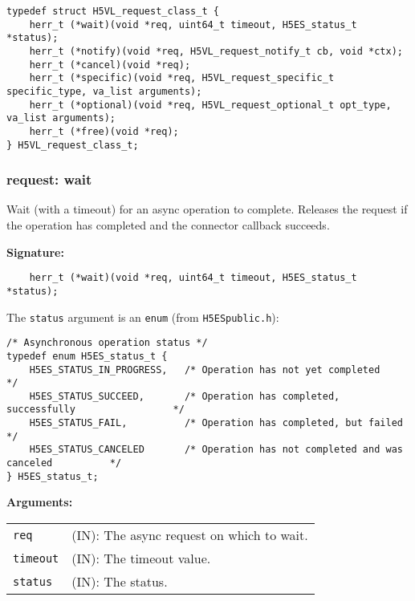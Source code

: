 \begin{lstlisting}[caption={Structure for async request callback routines, H5VLconnector.h}, captionpos=b, label={lst:Requestclass}]
typedef struct H5VL_request_class_t {
    herr_t (*wait)(void *req, uint64_t timeout, H5ES_status_t *status);
    herr_t (*notify)(void *req, H5VL_request_notify_t cb, void *ctx);
    herr_t (*cancel)(void *req);
    herr_t (*specific)(void *req, H5VL_request_specific_t specific_type, va_list arguments);
    herr_t (*optional)(void *req, H5VL_request_optional_t opt_type, va_list arguments);
    herr_t (*free)(void *req);
} H5VL_request_class_t;
\end{lstlisting}

\subsubsection{request: wait}
Wait (with a timeout) for an async operation to complete. Releases the request if the operation has completed and the connector callback succeeds.

\begin{mdframed}[style=bgbox]
\textbf{Signature:}
\begin{lstlisting}
    herr_t (*wait)(void *req, uint64_t timeout, H5ES_status_t *status);          
\end{lstlisting}

The \texttt{status} argument is an \texttt{enum} (from \texttt{H5ESpublic.h}):
\begin{lstlisting}
/* Asynchronous operation status */                                              
typedef enum H5ES_status_t {                                                     
    H5ES_STATUS_IN_PROGRESS,   /* Operation has not yet completed                       */
    H5ES_STATUS_SUCCEED,       /* Operation has completed, successfully                 */
    H5ES_STATUS_FAIL,          /* Operation has completed, but failed                   */
    H5ES_STATUS_CANCELED       /* Operation has not completed and was canceled          */
} H5ES_status_t;
\end{lstlisting} 
    
\textbf{Arguments:}\\
\begin{tabular}{l p{13.5cm}}
  \texttt{req} & (IN): The async request on which to wait.\\
  \texttt{timeout} & (IN): The timeout value.\\
  \texttt{status} & (IN): The status.\\
\end{tabular}
\end{mdframed}

